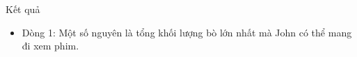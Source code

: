Kết quả  
\begin{itemize}
	\item     Dòng 1: Một số nguyên là tổng khối lượng bò lớn nhất mà John        có thể mang đi xem phim.   
\end{itemize}